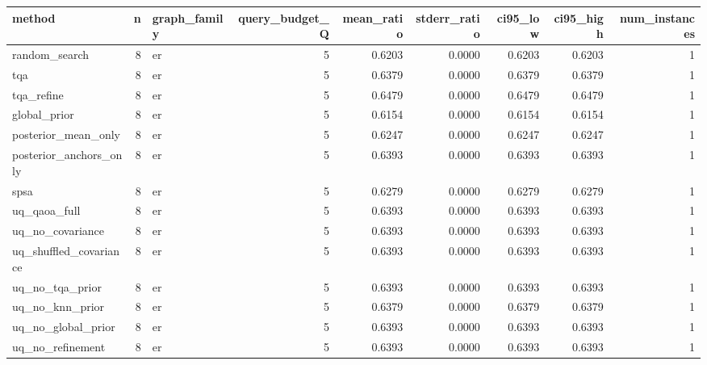 \begin{tabular}{lrlrrrrrr}
\toprule
method & n & graph_family & query_budget_Q & mean_ratio & stderr_ratio & ci95_low & ci95_high & num_instances \\
\midrule
random_search & 8 & er & 5 & 0.6203 & 0.0000 & 0.6203 & 0.6203 & 1 \\
tqa & 8 & er & 5 & 0.6379 & 0.0000 & 0.6379 & 0.6379 & 1 \\
tqa_refine & 8 & er & 5 & 0.6479 & 0.0000 & 0.6479 & 0.6479 & 1 \\
global_prior & 8 & er & 5 & 0.6154 & 0.0000 & 0.6154 & 0.6154 & 1 \\
posterior_mean_only & 8 & er & 5 & 0.6247 & 0.0000 & 0.6247 & 0.6247 & 1 \\
posterior_anchors_only & 8 & er & 5 & 0.6393 & 0.0000 & 0.6393 & 0.6393 & 1 \\
spsa & 8 & er & 5 & 0.6279 & 0.0000 & 0.6279 & 0.6279 & 1 \\
uq_qaoa_full & 8 & er & 5 & 0.6393 & 0.0000 & 0.6393 & 0.6393 & 1 \\
uq_no_covariance & 8 & er & 5 & 0.6393 & 0.0000 & 0.6393 & 0.6393 & 1 \\
uq_shuffled_covariance & 8 & er & 5 & 0.6393 & 0.0000 & 0.6393 & 0.6393 & 1 \\
uq_no_tqa_prior & 8 & er & 5 & 0.6393 & 0.0000 & 0.6393 & 0.6393 & 1 \\
uq_no_knn_prior & 8 & er & 5 & 0.6379 & 0.0000 & 0.6379 & 0.6379 & 1 \\
uq_no_global_prior & 8 & er & 5 & 0.6393 & 0.0000 & 0.6393 & 0.6393 & 1 \\
uq_no_refinement & 8 & er & 5 & 0.6393 & 0.0000 & 0.6393 & 0.6393 & 1 \\
\bottomrule
\end{tabular}
